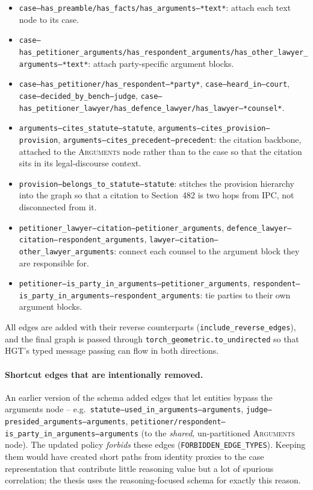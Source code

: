 \begin{itemize}
  \item \texttt{case--has\_preamble/has\_facts/has\_arguments--*text*}:
    attach each text node to its case.
  \item \texttt{case--has\_petitioner\_arguments/has\_respondent\_arguments/has\_other\_lawyer\_arguments--*text*}:
    attach party-specific argument blocks.
  \item \texttt{case--has\_petitioner/has\_respondent--*party*},
    \texttt{case--heard\_in--court},
    \texttt{case--decided\_by\_bench--judge},
    \texttt{case--has\_petitioner\_lawyer/has\_defence\_lawyer/has\_lawyer--*counsel*}.
  \item \texttt{arguments--cites\_statute--statute},
    \texttt{arguments--cites\_provision--provision},
    \texttt{arguments--cites\_precedent--precedent}: the citation
    backbone, attached to the \textsc{Arguments} node rather than to
    the case so that the citation sits in its legal-discourse
    context.
  \item \texttt{provision--belongs\_to\_statute--statute}: stitches
    the provision hierarchy into the graph so that a citation to
    Section~482 is two hops from IPC, not disconnected from it.
  \item \texttt{petitioner\_lawyer--citation--petitioner\_arguments},
    \texttt{defence\_lawyer--citation--respondent\_arguments},
    \texttt{lawyer--citation--other\_lawyer\_arguments}: connect each
    counsel to the argument block they are responsible for.
  \item \texttt{petitioner--is\_party\_in\_arguments--petitioner\_arguments},
    \texttt{respondent--is\_party\_in\_arguments--respondent\_arguments}:
    tie parties to their own argument blocks.
\end{itemize}

All edges are added with their reverse counterparts
(\texttt{include\_reverse\_edges}), and the final graph is passed
through \texttt{torch\_geometric.to\_undirected} so that HGT's typed
message passing can flow in both directions.

\paragraph{Shortcut edges that are intentionally removed.}
An earlier version of the schema added edges that let entities bypass
the arguments node -- e.g.\
\texttt{statute--used\_in\_arguments--arguments},
\texttt{judge--presided\_arguments--arguments},
\texttt{petitioner/respondent--is\_party\_in\_arguments--arguments} (to
the \emph{shared}, un-partitioned \textsc{Arguments} node). The updated
policy \emph{forbids} these edges (\texttt{FORBIDDEN\_EDGE\_TYPES}).
Keeping them would have created short paths from identity proxies to
the case representation that contribute little reasoning value but a
lot of spurious correlation; the thesis uses the reasoning-focused
schema for exactly this reason.

